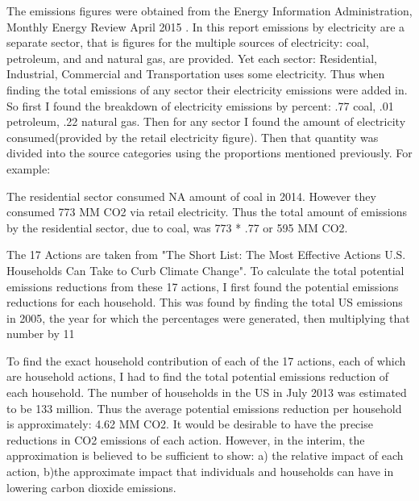 \documentclass{article}
\begin{document}
The emissions figures were obtained from the Energy Information Administration, Monthly Energy Review April 2015 \cite{EIA}. In this report emissions by electricity are a separate sector, that is figures for the multiple sources of electricity: coal, petroleum, and and natural gas, are provided. Yet each sector: Residential, Industrial, Commercial and Transportation uses some electricity. Thus when finding the total emissions of any sector their electricity emissions were added in. So first I found the breakdown of electricity emissions by percent: .77 coal, .01 petroleum, .22 natural gas. Then for any sector I found the amount of electricity consumed(provided by the retail electricity figure). Then that quantity was divided into the source categories using the proportions mentioned previously. For example:      
     
The residential sector consumed NA amount of coal in 2014. However they consumed 773 MM CO2 via retail electricity. Thus the total amount of emissions by the residential sector, due to coal, was 773 * .77 or 595 MM CO2.
     
The 17 Actions are taken from "The Short List: The Most Effective Actions U.S. Households Can Take to Curb Climate Change"\cite{Environment}. To calculate the total potential emissions reductions from these 17 actions, I first found the potential emissions reductions for each household. This was found by finding the total US emissions in 2005, the year for which the percentages were generated, then multiplying that number by 11%
     
To find the exact household contribution of each of the 17 actions, each of which are household actions, I had to find the total potential emissions reduction of each household. The number of households in the US in July 2013 was estimated to be 133 million\cite{CensusOne}. Thus the average potential emissions reduction per household is approximately: 4.62 MM CO2. It would be desirable to have the precise reductions in CO2 emissions of each action. However, in the interim, the approximation is believed to be sufficient to show: a) the relative impact of each action, b)the approximate impact that individuals and households can have in lowering carbon dioxide emissions.     
      
   
     
  

     
     
\end{document}
